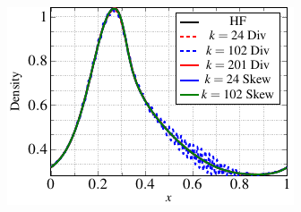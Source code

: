 \begin{figure}
\begin{subfigure}[t]{0.47\linewidth}
\label{density_reduction}
\end{subfigure}

\begin{subfigure}[]{0.47\linewidth}
        \includegraphics[scale=1]{Figures/paper-figure17.pdf}

\end{subfigure}
\end{figure}
